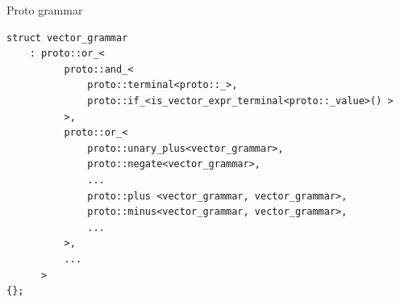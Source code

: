 \documentclass[@BEAMER_OPTIONS@]{beamer}
\begin{document}
\begin{frame}[fragile]
    \begin{exampleblock}{Proto grammar}
        \begin{lstlisting}
struct vector_grammar
    : proto::or_<
          proto::and_<
              proto::terminal<proto::_>,
              proto::if_<is_vector_expr_terminal<proto::_value>() >
          >,
          proto::or_<
              proto::unary_plus<vector_grammar>,
              proto::negate<vector_grammar>,
              ...
              proto::plus <vector_grammar, vector_grammar>,
              proto::minus<vector_grammar, vector_grammar>,
              ...
          >,
          ...
      >
{};
        \end{lstlisting}
    \end{exampleblock}
\end{frame}
\end{document}
